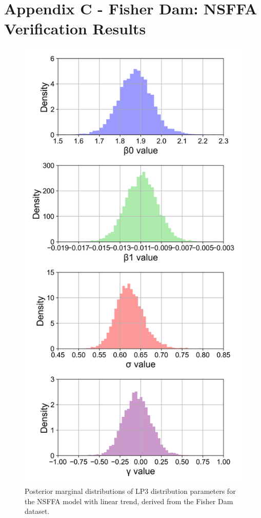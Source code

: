 \newpage
\section*{Appendix C - Fisher Dam: NSFFA Verification Results}

\begin{figure}[H]
    \centering
    \includegraphics[width=1\linewidth]{_plots/OCD_linear_mu_posterior_marginal_lp3.png}
    \caption{Posterior marginal distributions of LP3 distribution parameters for the NSFFA model with linear trend, derived from the Fisher Dam dataset.}
    \label{fig:OCD_linear_mu_posterior_marginal_lp3}
\end{figure}


